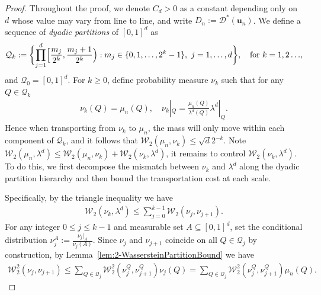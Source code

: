\documentclass[11pt]{article}
\newcommand{\bs}[1]{\boldsymbol{#1}}
\begin{document}
\begin{proof}
Throughout the proof, we denote $C_d>0$ as a constant depending only on $d$ whose value may vary from line to line, and write $D_n:=\mathcal{D}^*({\bs u}_n)$. We define a sequence of \emph{dyadic partitions} of $[0, 1]^d$ as 
\begin{align*}
    \mathcal{Q}_{k} := \biggl\{\prod_{j = 1}^d \Bigl[\frac{m_j}{2^k}, \frac{m_{j}+1}{2^k}\Bigr): m_j \in \{0, 1, \ldots, 2^k-1\}, \ j = 1, \ldots, d \biggr\} , \quad \text{for $k = 1, 2\ldots $,}
\end{align*}
and $\mathcal{Q}_0 = [0, 1]^d$. For $k \geq 0$, define probability measure $\nu_k$ such that for any $Q \in \mathcal{Q}_k$
\begin{align*}
    \nu_k(Q) = \mu_n(Q), \quad \nu_k|_Q = \frac{\mu_n(Q)}{\lambda^d(Q)} \lambda^d|_{Q}. 
\end{align*}
Hence when transporting from $\nu_k$ to $\mu_n$, the mass will only move within each component of $\mathcal{Q}_k$, and it follows that $\mathcal{W}_2(\mu_n, \nu_k) \leq \sqrt{d} 2^{-k}$. Note $\mathcal{W}_2(\mu_n, \lambda^d) \leq \mathcal{W}_2(\mu_n, \nu_k) + \mathcal{W}_2(\nu_k, \lambda^d)$, it remains to control $\mathcal{W}_2(\nu_k, \lambda^d)$. To do this, we first decompose the mismatch between $\nu_k$ and $\lambda^d$ along the dyadic partition hierarchy and then bound the transportation cost at each scale. 

Specifically, by the triangle inequality we have
\begin{align}
    \mathcal{W}_2(\nu_k, \lambda^d) \leq \sum_{j = 0}^{k-1} \mathcal{W}_2(\nu_{j}, \nu_{j+1}). \label{eq:DyadicDecompose}
\end{align}
For any integer $0 \leq j \leq k-1$ and measurable set $A \subseteq [0, 1]^d$, set the conditional distribution $\nu_j^A:= \frac{\nu_j|_A}{\nu_j(A)}$. Since $\nu_j$ and $\nu_{j+1}$ coincide on all $Q \in \mathcal{Q}_j$ by construction, by Lemma~\ref{lem:2-WassersteinPartitionBound} we have 
\begin{align}
\mathcal{W}_2^2(\nu_j, \nu_{j+1}) \leq \sum_{Q \in \mathcal{Q}_j} \mathcal{W}_2^2(\nu_j^{Q}, \nu_{j+1}^{Q}) \nu_j (Q) = \sum_{Q \in \mathcal{Q}_j} \mathcal{W}_2^2(\nu_j^{Q}, \nu_{j+1}^{Q}) \mu_n (Q).  \label{eq:ScaleControl}
\end{align}


\end{proof}
\end{document}
